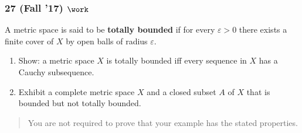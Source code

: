 \hypertarget{fall-17-work-1}{%
\subsubsection{\texorpdfstring{27 (Fall '17)
\(\work\)}{27 (Fall '17) \textbackslash work}}\label{fall-17-work-1}}

\begin{problem}[?]

A metric space is said to be \textbf{totally bounded} if for every
\(\varepsilon> 0\) there exists a finite cover of \(X\) by open balls of
radius \(\varepsilon\).

\begin{enumerate}
\def\labelenumi{\alph{enumi}.}
\item
  Show: a metric space \(X\) is totally bounded iff every sequence in
  \(X\) has a Cauchy subsequence.
\item
  Exhibit a complete metric space \(X\) and a closed subset \(A\) of
  \(X\) that is bounded but not totally bounded.
\end{enumerate}

\begin{quote}
You are not required to prove that your example has the stated
properties.
\end{quote}

\end{problem}

